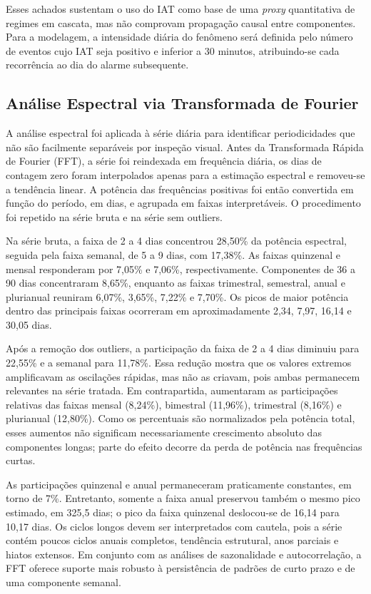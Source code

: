 Esses achados sustentam o uso do IAT como base de uma \textit{proxy} quantitativa de regimes em cascata, mas não comprovam propagação causal entre componentes. Para a modelagem, a intensidade diária do fenômeno será definida pelo número de eventos cujo IAT seja positivo e inferior a 30 minutos, atribuindo-se cada recorrência ao dia do alarme subsequente.

\subsection{Análise Espectral via Transformada de Fourier}

A análise espectral foi aplicada à série diária para identificar periodicidades que não são facilmente separáveis por inspeção visual. Antes da Transformada Rápida de Fourier (FFT), a série foi reindexada em frequência diária, os dias de contagem zero foram interpolados apenas para a estimação espectral e removeu-se a tendência linear. A potência das frequências positivas foi então convertida em função do período, em dias, e agrupada em faixas interpretáveis. O procedimento foi repetido na série bruta e na série sem outliers.

Na série bruta, a faixa de 2 a 4 dias concentrou 28,50\% da potência espectral, seguida pela faixa semanal, de 5 a 9 dias, com 17,38\%. As faixas quinzenal e mensal responderam por 7,05\% e 7,06\%, respectivamente. Componentes de 36 a 90 dias concentraram 8,65\%, enquanto as faixas trimestral, semestral, anual e plurianual reuniram 6,07\%, 3,65\%, 7,22\% e 7,70\%. Os picos de maior potência dentro das principais faixas ocorreram em aproximadamente 2,34, 7,97, 16,14 e 30,05 dias.

Após a remoção dos outliers, a participação da faixa de 2 a 4 dias diminuiu para 22,55\% e a semanal para 11,78\%. Essa redução mostra que os valores extremos amplificavam as oscilações rápidas, mas não as criavam, pois ambas permanecem relevantes na série tratada. Em contrapartida, aumentaram as participações relativas das faixas mensal (8,24\%), bimestral (11,96\%), trimestral (8,16\%) e plurianual (12,80\%). Como os percentuais são normalizados pela potência total, esses aumentos não significam necessariamente crescimento absoluto das componentes longas; parte do efeito decorre da perda de potência nas frequências curtas.

As participações quinzenal e anual permaneceram praticamente constantes, em torno de 7\%. Entretanto, somente a faixa anual preservou também o mesmo pico estimado, em 325,5 dias; o pico da faixa quinzenal deslocou-se de 16,14 para 10,17 dias. Os ciclos longos devem ser interpretados com cautela, pois a série contém poucos ciclos anuais completos, tendência estrutural, anos parciais e hiatos extensos. Em conjunto com as análises de sazonalidade e autocorrelação, a FFT oferece suporte mais robusto à persistência de padrões de curto prazo e de uma componente semanal.

